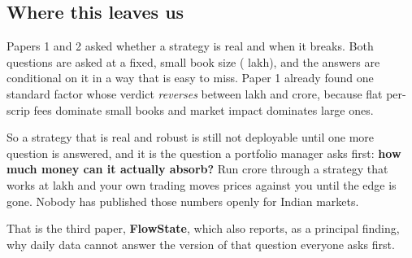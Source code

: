 \documentclass[11pt,a4paper]{article}
\begin{document}
\subsection*{Where this leaves us}

Papers 1 and 2 asked whether a strategy is real and when it breaks. Both questions are asked at a
fixed, small book size ( lakh), and the answers are conditional on it in a way that
is easy to miss. Paper 1 already found one standard factor whose verdict \emph{reverses} between
 lakh and  crore, because flat per-scrip fees dominate small books and market
impact dominates large ones.

So a strategy that is real and robust is still not deployable until one more question is answered,
and it is the question a portfolio manager asks first: \textbf{how much money can it actually
absorb?} Run  crore through a strategy that works at  lakh and your own trading
moves prices against you until the edge is gone. Nobody has published those numbers openly for
Indian markets.

That is the third paper, \textbf{FlowState}, which also reports, as a principal finding, why
daily data cannot answer the version of that question everyone asks first.
\end{document}
